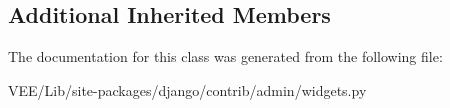 \subsection*{Additional Inherited Members}


The documentation for this class was generated from the following file\+:\begin{DoxyCompactItemize}
\item 
V\+E\+E/\+Lib/site-\/packages/django/contrib/admin/widgets.\+py\end{DoxyCompactItemize}
